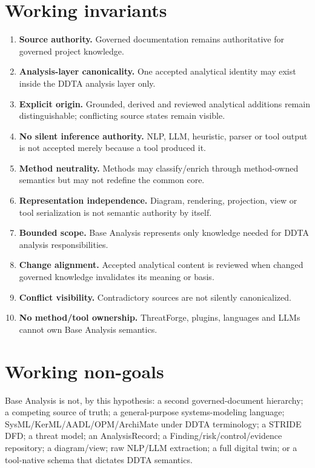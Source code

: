 \documentclass[10pt,a4paper]{article}
\begin{document}
\section{Working invariants}
\begin{enumerate}
\item \textbf{Source authority.} Governed documentation remains authoritative for governed project knowledge.
\item \textbf{Analysis-layer canonicality.} One accepted analytical identity may exist inside the DDTA analysis layer only.
\item \textbf{Explicit origin.} Grounded, derived and reviewed analytical additions remain distinguishable; conflicting source states remain visible.
\item \textbf{No silent inference authority.} NLP, LLM, heuristic, parser or tool output is not accepted merely because a tool produced it.
\item \textbf{Method neutrality.} Methods may classify/enrich through method-owned semantics but may not redefine the common core.
\item \textbf{Representation independence.} Diagram, rendering, projection, view or tool serialization is not semantic authority by itself.
\item \textbf{Bounded scope.} Base Analysis represents only knowledge needed for DDTA analysis responsibilities.
\item \textbf{Change alignment.} Accepted analytical content is reviewed when changed governed knowledge invalidates its meaning or basis.
\item \textbf{Conflict visibility.} Contradictory sources are not silently canonicalized.
\item \textbf{No method/tool ownership.} ThreatForge, plugins, languages and LLMs cannot own Base Analysis semantics.
\end{enumerate}

\section{Working non-goals}
Base Analysis is not, by this hypothesis: a second governed-document hierarchy; a competing source of truth; a general-purpose systems-modeling language; SysML/KerML/AADL/OPM/ArchiMate under DDTA terminology; a STRIDE DFD; a threat model; an AnalysisRecord; a Finding/risk/control/evidence repository; a diagram/view; raw NLP/LLM extraction; a full digital twin; or a tool-native schema that dictates DDTA semantics.
\end{document}
